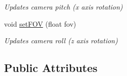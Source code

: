 \begin{DoxyCompactItemize}
\begin{DoxyCompactList}\small\item\em Updates camera pitch (x axis rotation) \end{DoxyCompactList}\item 
\hypertarget{class_camera_ade53ee61895c2143da3cec03d08ef3eb}{void \hyperlink{class_camera_ade53ee61895c2143da3cec03d08ef3eb}{set\+F\+O\+V} (float fov)}\label{class_camera_ade53ee61895c2143da3cec03d08ef3eb}

\begin{DoxyCompactList}\small\item\em Updates camera roll (z axis rotation) \end{DoxyCompactList}\end{DoxyCompactItemize}
\subsection*{Public Attributes}
